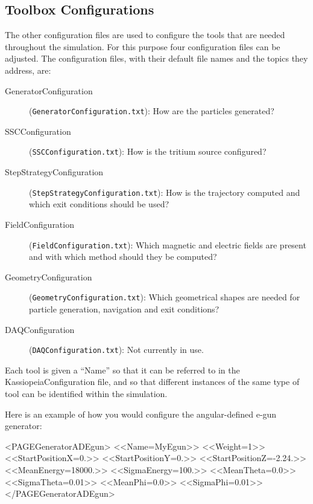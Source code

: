 \subsection{Toolbox Configurations}
The other configuration files are used to configure the tools that are needed throughout the simulation. For this purpose four configuration files can be adjusted. The configuration files, with their default file names and the topics they address, are:
\begin{description}
	\item[GeneratorConfiguration] (\texttt{GeneratorConfiguration.txt}): How are the particles generated?
	\item[SSCConfiguration] (\texttt{SSCConfiguration.txt}): How is the tritium source configured?
	\item[StepStrategyConfiguration] (\texttt{StepStrategyConfiguration.txt}): How is the trajectory computed and which exit conditions should be used?
	\item[FieldConfiguration] (\texttt{FieldConfiguration.txt}): Which magnetic and electric fields are present and with which method should they be computed?
	\item[GeometryConfiguration] (\texttt{GeometryConfiguration.txt}): Which geometrical shapes are needed for particle generation, navigation and exit conditions?
	\item[DAQConfiguration] (\texttt{DAQConfiguration.txt}): Not currently in use.
\end{description}

Each tool is given a ``Name'' so that it can be referred to in the KassiopeiaConfiguration file, and so that different instances of the same type of tool can be identified within the simulation.

Here is an example of how you would configure the angular-defined e-gun generator:
\begin{DoxyCode}
<PAGEGeneratorADEgun>
    <<Name=MyEgun>> 
    <<Weight=1>>
    <<StartPositionX=0.>>
    <<StartPositionY=0.>>
    <<StartPositionZ=-2.24.>>
    <<MeanEnergy=18000.>>
    <<SigmaEnergy=100.>>
    <<MeanTheta=0.0>>
    <<SigmaTheta=0.01>>
    <<MeanPhi=0.0>>
    <<SigmaPhi=0.01>>
</PAGEGeneratorADEgun>
\end{DoxyCode}


